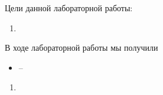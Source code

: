 
Цели данной лабораторной работы:
\begin{enumerate}
	\item 
\end{enumerate}



\begin{figure}[!htbp]
	\centering
	\caption{}
\end{figure}
\FloatBarrier

%



В ходе лабораторной работы мы получили 
\begin{itemize}
	\item --
\end{itemize}


\begin{enumerate}
	\item \textit{}\newline 
\end{enumerate}

